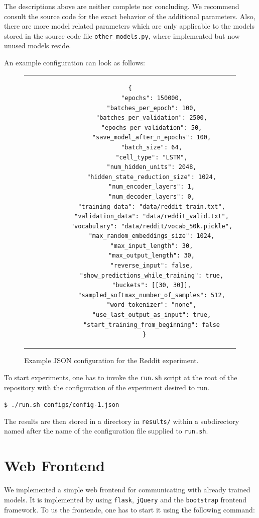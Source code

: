 The descriptions above are neither complete nor concluding. We recommend consult the source code for the exact behavior of the additional parameters. Also, there are more model related parameters which are only applicable to the models stored in the source code file \texttt{other\_models.py}, where implemented but now unused models reside.

\clearpage

An example configuration can look as follows:

\begin{figure}[thp]
	\centering
	\begin{tabular}{c}  %
		\begin{lstlisting}[style=json]
		{
			"epochs": 150000,
			"batches_per_epoch": 100,
			"batches_per_validation": 2500,
			"epochs_per_validation": 50,
			"save_model_after_n_epochs": 100,
			"batch_size": 64,
			"cell_type": "LSTM",
			"num_hidden_units": 2048,
			"hidden_state_reduction_size": 1024,
			"num_encoder_layers": 1,
			"num_decoder_layers": 0,
			"training_data": "data/reddit_train.txt",
			"validation_data": "data/reddit_valid.txt",
			"vocabulary": "data/reddit/vocab_50k.pickle",
			"max_random_embeddings_size": 1024,
			"max_input_length": 30,
			"max_output_length": 30,
			"reverse_input": false,
			"show_predictions_while_training": true,
			"buckets": [[30, 30]],
			"sampled_softmax_number_of_samples": 512,
			"word_tokenizer": "none",
			"use_last_output_as_input": true,
			"start_training_from_beginning": false
		}
		\end{lstlisting}
	\end{tabular}
	\label{software_usage:config_json_example}
	\caption{Example JSON configuration for the Reddit experiment.}
\end{figure}

To start experiments, one has to invoke the \texttt{run.sh} script at the root of the repository with the configuration of the experiment desired to run.

\texttt{\$ ./run.sh configs/config-1.json}

The results are then stored in a directory in \texttt{results/} within a subdirectory named after the name of the configuration file supplied to \texttt{run.sh}.

\section{Web Frontend}
\label{sofware_usage:web_frontend}
We implemented a simple web frontend for communicating with already trained models. It is implemented by using \texttt{flask}, \texttt{jQuery} and the \texttt{bootstrap} frontend framework. To us the frontende, one has to start  it using the following command:

